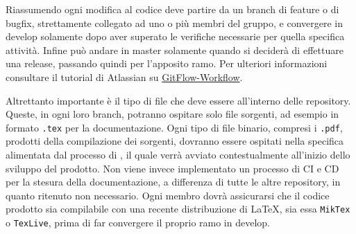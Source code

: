 Riassumendo ogni modifica al codice deve partire da un branch di feature o di bugfix, strettamente collegato ad uno o più membri del gruppo, e convergere in develop solamente dopo
aver superato le verifiche necessarie per quella specifica attività.
Infine può andare in master solamente quando si deciderà di effettuare una release, passando quindi per l'apposito ramo.
Per ulteriori informazioni consultare il tutorial di Atlassian su \href{https://www.atlassian.com/git/tutorials/comparing-workflows/gitflow-workflow}{GitFlow-Workflow}.

Altrettanto importante è il tipo di file che deve essere all'interno delle repository. Queste, in ogni loro branch, potranno ospitare solo file sorgenti, ad esempio
in formato \verb|.tex| per la documentazione. Ogni tipo di file binario, compresi i \verb|.pdf|, prodotti della compilazione dei sorgenti, dovranno essere
ospitati nella specifica \textit{} alimentata dal processo di \textit{}, il quale verrà avviato contestualmente
all'inizio dello sviluppo del prodotto. Non viene invece implementato un processo di CI e CD per la stesura della documentazione, a differenza di tutte le altre repository,
in quanto ritenuto non necessario. Ogni membro dovrà assicurarsi che il codice prodotto sia compilabile con una recente distribuzione di \LaTeX,
sia essa \verb|MikTex| o \verb|TexLive|, prima di far convergere il proprio ramo in develop.

